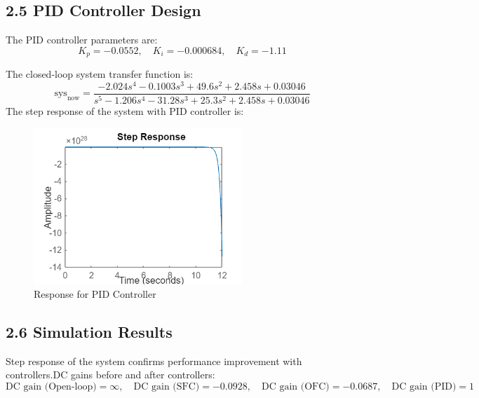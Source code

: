 \documentclass[a4paper,12pt]{article}
\begin{document}
\subsection*{2.5 PID Controller Design}
The PID controller parameters are:
\[
K_p = -0.0552, \quad K_i = -0.000684, \quad K_d = -1.11
\]

The closed-loop system transfer function is:
\[
\text{sys}_{\text{now}} =
\frac{-2.024s^4 - 0.1003s^3 + 49.6s^2 + 2.458s + 0.03046}
{s^5 - 1.206s^4 - 31.28s^3 + 25.3s^2 + 2.458s + 0.03046}
\]
\newpage
The step response of the system with PID controller is:
\begin{figure}[H]
    \centering
    \includegraphics[width=0.7\textwidth]{PID.png}
    \caption{Response for PID Controller}
\end{figure}


\subsection*{2.6 Simulation Results}
Step response of the system confirms performance improvement with controllers.DC gains before and after controllers:
\[
\text{DC gain (Open-loop)} = \infty, \quad
\text{DC gain (SFC)} = -0.0928, \quad
\text{DC gain (OFC)} = -0.0687, \quad
\text{DC gain (PID)} = 1
\]
\end{document}
